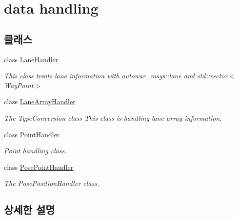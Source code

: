 \hypertarget{group___data_handling_group}{}\section{data handling}
\label{group___data_handling_group}
\subsection*{클래스}
\begin{DoxyCompactItemize}
\item 
class \hyperlink{class_lane_handler}{Lane\+Handler}
\begin{DoxyCompactList}\small\item\em This class treats lane information with autowar\+\_\+msgs\+::lane and std\+::vector$<$\+Way\+Point$>$ \end{DoxyCompactList}\item 
class \hyperlink{class_lane_array_handler}{Lane\+Array\+Handler}
\begin{DoxyCompactList}\small\item\em The Type\+Conversion class This class is handling lane array information. \end{DoxyCompactList}\item 
class \hyperlink{class_point_handler}{Point\+Handler}
\begin{DoxyCompactList}\small\item\em Point handling class. \end{DoxyCompactList}\item 
class \hyperlink{class_pose_point_handler}{Pose\+Point\+Handler}
\begin{DoxyCompactList}\small\item\em The Pose\+Position\+Handler class. \end{DoxyCompactList}\end{DoxyCompactItemize}


\subsection{상세한 설명}
